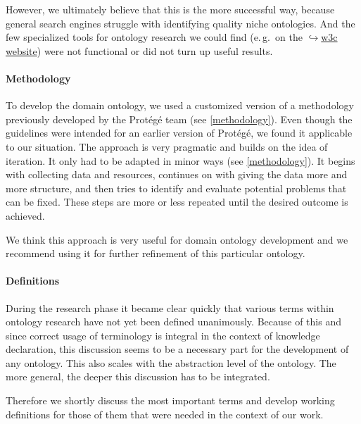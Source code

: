 \documentclass[a4paper, DIV=13, BCOR=0cm]{scrbook}
\newcommand{\eg}{e.\,g.\ }
\newcommand{\link}[2]{\href{#1}{$\hookrightarrow$#2}}
\begin{document}
However, we ultimately believe that this is the more successful way, because general search engines struggle with identifying quality niche ontologies. And the few specialized tools for ontology research we could find (\eg on the \link{https://www.w3.org/wiki/Search_engines}{\gls{w3c} website}) were not functional or did not turn up useful results.

\paragraph{Methodology}
To develop the domain ontology, we used a customized version of a methodology previously developed by the Protégé team (see \autoref{methodology}). Even though the guidelines were intended for an earlier version of Protégé, we found it applicable to our situation. The approach is very pragmatic and builds on the idea of iteration. It only had to be adapted in minor ways (see \autoref{methodology}). It begins with collecting data and resources, continues on with giving the data more and more structure, and then tries to identify and evaluate potential problems that can be fixed. These steps are more or less repeated until the desired outcome is achieved.

We think this approach is very useful for domain ontology development and we recommend using it for further refinement of this particular ontology.

\paragraph{Definitions}
During the research phase it became clear quickly that various terms within ontology research have not yet been defined unanimously. Because of this and since correct usage of terminology is integral in the context of knowledge declaration, this discussion seems to be a necessary part for the development of any ontology. This also scales with the abstraction level of the ontology. The more general, the deeper this discussion has to be integrated.

Therefore we shortly discuss the most important terms and develop working definitions for those of them that were needed in the context of our work.

%
%
\end{document}
